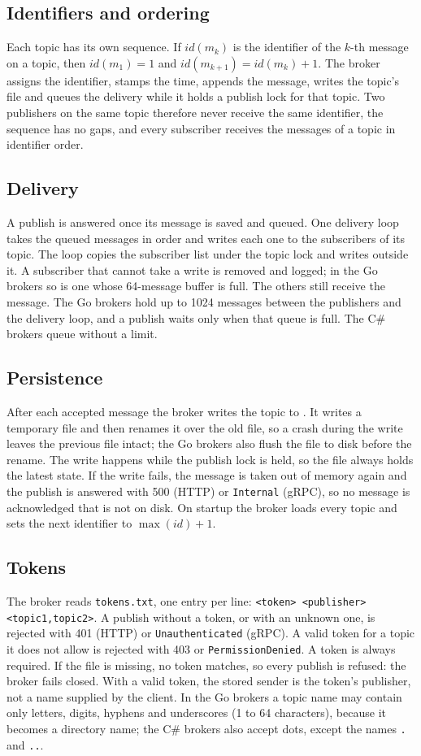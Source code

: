 \documentclass[12pt,a4paper]{article}
\begin{document}
\subsection{Identifiers and ordering}
Each topic has its own sequence. If $id(m_k)$ is the identifier of the $k$-th
message on a topic, then $id(m_1)=1$ and $id(m_{k+1})=id(m_k)+1$. The broker
assigns the identifier, stamps the time, appends the message, writes the topic's
file and queues the delivery while it holds a publish lock for that topic. Two
publishers on the same topic therefore never receive the same identifier, the
sequence has no gaps, and every subscriber receives the messages of a topic in
identifier order.

\subsection{Delivery}
A publish is answered once its message is saved and queued. One delivery loop
takes the queued messages in order and writes each one to the subscribers of its
topic. The loop copies the subscriber list under the topic lock and writes outside
it. A subscriber that cannot take a write is removed and logged; in the Go brokers
so is one whose 64-message buffer is full. The others still receive the message.
The Go brokers hold up to 1024 messages between the publishers and the delivery
loop, and a publish waits only when that queue is full. The C\# brokers queue
without a limit.

\subsection{Persistence}
After each accepted message the broker writes the topic to
. It writes a temporary file and then
renames it over the old file, so a crash during the write leaves the previous
file intact; the Go brokers also flush the file to disk before the rename. The
write happens while the publish lock is held, so the file always holds the latest
state. If the write fails, the message is taken out of memory again and the
publish is answered with 500 (HTTP) or \texttt{Internal} (gRPC), so no message is
acknowledged that is not on disk. On startup the broker loads every topic and sets
the next identifier to $\max(id)+1$.

\subsection{Tokens}
The broker reads \texttt{tokens.txt}, one entry per line:
\texttt{<token> <publisher> <topic1,topic2>}. A publish without a token, or with
an unknown one, is rejected with 401 (HTTP) or \texttt{Unauthenticated} (gRPC). A
valid token for a topic it does not allow is rejected with 403 or
\texttt{PermissionDenied}. A token is always required. If the file is missing, no
token matches, so every publish is refused: the broker fails closed. With a valid
token, the stored sender is the token's publisher, not a name supplied by the
client. In the Go brokers a topic name may contain only letters, digits, hyphens
and underscores (1 to 64 characters), because it becomes a directory name; the
C\# brokers also accept dots, except the names \texttt{.} and \texttt{..}.
\end{document}
